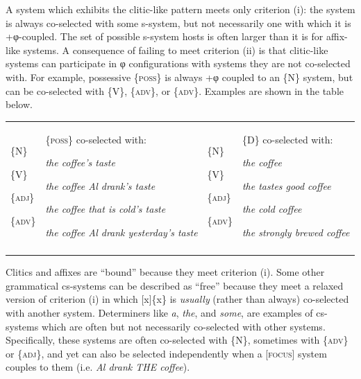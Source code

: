   A system which exhibits the clitic-like pattern meets only criterion (i): the system is always co-selected with some s-system, but not necessarily one with which it is +φ-coupled. The set of possible s-system hosts is often larger than it is for affix-like systems. A consequence of failing to meet criterion (ii) is that clitic-like systems can participate in φ configurations with systems they are not co-selected with. For example, possessive \{\textsc{poss}\} is always +φ coupled to an \{N\} system, but can be co-selected with \{V\}, \{\textsc{adv}\}, or \{\textsc{adv}\}. Examples are shown in the table below.

\begin{tabularx}{\textwidth}{XXXX}
\lsptoprule
\raggedleft \{N\} \par

\raggedleft \{V\}\par

\raggedleft \{\textsc{adj}\}\par

\raggedleft \{\textsc{adv}\} & \{\textsc{poss}\} co-selected with:

\textit{the coffee’s taste} 

\textit{the coffee Al drank’s taste}

\textit{the coffee that is cold’s taste}

\textit{the coffee Al drank yesterday’s taste} & \raggedleft \{N\}\par

\raggedleft \{V\}\par

\raggedleft \{\textsc{adj}\}\par

\raggedleft \{\textsc{adv}\} & \{\textsc{D}\} co-selected with:

\textit{the coffee}

\textit{the tastes good coffee}

\textit{the cold coffee}

\textit{the strongly brewed coffee}\\
\lspbottomrule
\end{tabularx}
  Clitics and affixes are “bound” because they meet criterion (i). Some other grammatical cs-systems can be described as “free” because they meet a relaxed version of criterion (i) in which [x]\{x\} is \textit{usually} (rather than always) co-selected with another system. Determiners like \textit{a}, \textit{the}, and \textit{some}, are examples of cs-systems which are often but not necessarily co-selected with other systems. Specifically, these systems are often co-selected with \{N\}, sometimes with \{\textsc{adv}\} or \{\textsc{adj}\}, and yet can also be selected independently when a [\textsc{focus}] system couples to them (i.e. \textit{Al drank THE coffee}).

